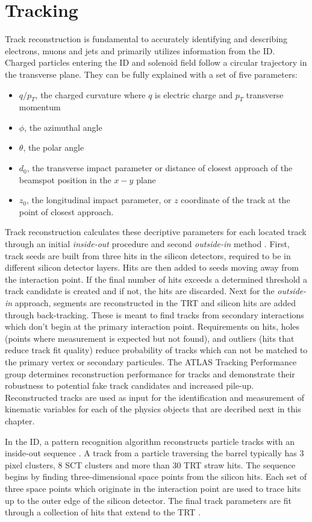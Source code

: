 \section{Tracking}
Track reconstruction is fundamental to accurately identifying and describing electrons, muons and jets and primarily utilizes information from the ID. Charged particles entering the ID and solenoid field follow a circular trajectory in the transverse plane. They can be fully explained with a set of five parameters:
\begin{itemize}
\item $q/p_T$, the charged curvature where $q$ is electric charge and $p_T$ transverse momentum
\item $\phi$, the azimuthal angle
\item $\theta$, the polar angle
\item $d_0$, the transverse impact parameter or distance of closest approach of the beamspot position in the $x-y$ plane
\item $z_0$, the longitudinal impact parameter, or $z$ coordinate of the track at the point of closest approach. 
\end{itemize}
Track reconstruction calculates these decriptive parameters for each located track through an initial \textit{inside-out} procedure and second \textit{outside-in} method \cite{tracking}. First, track seeds are built from three hits in the silicon detectors, required to be in different silicon detector layers. Hits are then added to seeds moving away from the interaction point. If the final number of hits exceeds a determined threshold a track candidate is created and if not, the hits are discarded. Next for the \textit{outside-in} approach, segments are reconstructed in the TRT and silicon hits are added  through back-tracking. These is meant to find tracks from secondary interactions which don't begin at the primary interaction point. Requirements on hits, holes (points where measurement is expected but not found), and outliers (hits that reduce track fit quality) reduce probability of tracks which can not be matched to the primary vertex or secondary particules. The ATLAS Tracking Performance group determines reconstruction performance for tracks and demonstrate their robustness to potential fake track candidates and increased pile-up. Reconstructed tracks are used as input for the identification and measurement of kinematic variables for each of the physics objects that are decribed next in this chapter. 

In the ID, a pattern recognition algorithm reconstructs particle tracks with an inside-out sequence \cite{patternrecognition}. A track from a particle traversing the barrel typically has 3 pixel clusters, 8 SCT clusters and more than 30 TRT straw hits. The sequence begins by finding three-dimensional space points from the silicon hits. Each set of three space points which originate in the  interaction point are used to trace hits up to the outer edge of the silicon detector. The final track parameters are fit through a collection of hits that extend to the TRT \cite{IDreconstruction}.

